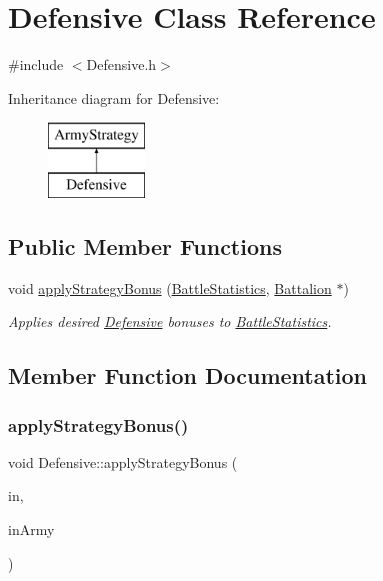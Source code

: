 \hypertarget{class_defensive}{}\section{Defensive Class Reference}
\label{class_defensive}


{\ttfamily \#include $<$Defensive.\+h$>$}

Inheritance diagram for Defensive\+:\begin{figure}[H]
\begin{center}
\leavevmode
\includegraphics[height=2.000000cm]{class_defensive}
\end{center}
\end{figure}
\subsection*{Public Member Functions}
\begin{DoxyCompactItemize}
\item 
void \mbox{\hyperlink{class_defensive_a6585a77b2d245fc8671fbf959483e1e0}{apply\+Strategy\+Bonus}} (\mbox{\hyperlink{class_battle_statistics}{Battle\+Statistics}}, \mbox{\hyperlink{class_battalion}{Battalion}} $\ast$)
\begin{DoxyCompactList}\small\item\em Applies desired \mbox{\hyperlink{class_defensive}{Defensive}} bonuses to \mbox{\hyperlink{class_battle_statistics}{Battle\+Statistics}}. \end{DoxyCompactList}\end{DoxyCompactItemize}


\subsection{Member Function Documentation}
\mbox{\label{class_defensive_a6585a77b2d245fc8671fbf959483e1e0}} 
\subsubsection{\texorpdfstring{applyStrategyBonus()}{applyStrategyBonus()}}
{\footnotesize\ttfamily void Defensive\+::apply\+Strategy\+Bonus (\begin{DoxyParamCaption}\item[{\mbox{\hyperlink{class_battle_statistics}{Battle\+Statistics}}}]{in,  }\item[{\mbox{\hyperlink{class_battalion}{Battalion}} $\ast$}]{in\+Army }\end{DoxyParamCaption})\hspace{0.3cm}{\ttfamily [virtual]}}



